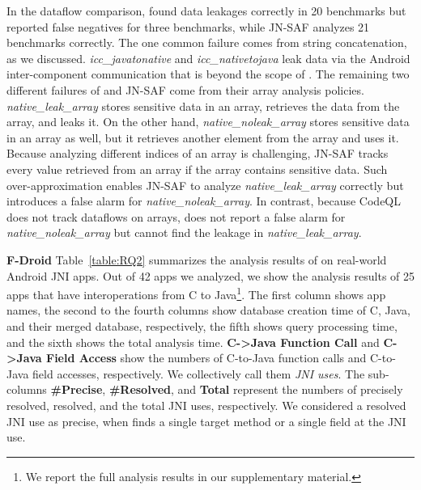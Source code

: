 

In the dataflow comparison, \ours found data leakages correctly in 20
benchmarks but reported false negatives for three benchmarks, while JN-SAF
analyzes 21 benchmarks correctly. 
The one common failure comes from string concatenation, as we discussed.
{\it icc\_javatonative} and {\it icc\_nativetojava} leak data via the Android
inter-component communication that is beyond the scope of \ours.
The remaining two different failures of \ours and JN-SAF come from their array analysis policies.
{\it native\_leak\_array} stores sensitive data in an array, retrieves the data from the array,
and leaks it.  On the other hand, {\it native\_noleak\_array} stores sensitive
data in an array as well, but it retrieves another element from the array and uses it.
Because analyzing different indices of an array is challenging, JN-SAF
tracks every value retrieved from an array if the array contains sensitive data.
Such over-approximation enables JN-SAF to analyze {\it
native\_leak\_array} correctly but introduces a false alarm for {\it
native\_noleak\_array}.  In contrast, because CodeQL does not
track dataflows on arrays, \ours does not report
a false alarm for {\it native\_noleak\_array} but cannot find the leakage in {\it
native\_leak\_array}.

\textbf{F-Droid} Table~\ref{table:RQ2} summarizes the analysis results of \ours on real-world Android JNI apps.
Out of 42 apps we analyzed, we show the analysis
results of 25 apps that have interoperations from C to Java\footnote{We
report the full analysis results in our supplementary material.}.
The first column shows app names, the second to the fourth columns show database
creation time of C, Java, and their merged database, respectively, the fifth
shows query processing time, and the sixth shows the total analysis time.
{\bf C->Java Function Call} and {\bf C->Java Field Access}
show the numbers of C-to-Java function calls and
C-to-Java field accesses, respectively. We collectively call them
\emph{JNI uses}.
The sub-columns {\bf \#Precise}, {\bf \#Resolved}, and {\bf Total}
represent the numbers of precisely resolved, 
resolved, and the total JNI uses, respectively.
We considered a resolved JNI use as precise, when \ours finds a single target method
or a single field at the JNI use.


